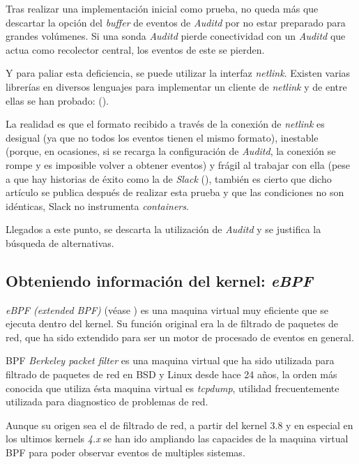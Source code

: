 Tras realizar una implementación inicial como prueba, no queda más que descartar la opción del \emph{buffer} de eventos de  \emph{Auditd} por no estar preparado para grandes volúmenes.
Si una sonda \emph{Auditd} pierde conectividad con un \emph{Auditd} que actua como recolector central, los eventos de este se pierden.

Y para paliar esta deficiencia, se puede utilizar la interfaz \emph{netlink}. Existen varias librerías en diversos lenguajes para implementar un cliente de \emph{netlink} y de entre ellas
se han probado: (\cite{netlink-glnpy,netlink-audit-go,netlink-go-audit}).

La realidad es que el formato recibido a través de la conexión de \emph{netlink} es desigual (ya que no todos los eventos tienen el mismo formato), inestable (porque, en ocasiones, si se recarga la configuración de \emph{Auditd}, la conexión se rompe y es imposible volver a obtener eventos) y frágil al trabajar con ella (pese a que hay historias de éxito
como la de \emph{Slack} (\cite{netlink-slack-success}), también es cierto que dicho artículo se publica después de realizar esta prueba y que las condiciones no son idénticas, Slack no instrumenta \emph{containers}.

Llegados a este punto, se descarta la utilización de \emph{Auditd} y se justifica la búsqueda de alternativas.

\subsection{Obteniendo información del kernel: \emph{eBPF}}
\label{subsec:ebpf}

\emph{eBPF (extended BPF)} (véase \cite{ebpf-brendan-gregg,ebpf-series}) es una maquina virtual muy eficiente que se ejecuta dentro del kernel. Su función original era la de filtrado de paquetes de red, que ha sido
extendido para ser un motor de procesado de eventos en general.

BPF \emph{Berkeley packet filter} es una maquina virtual que ha sido utilizada para filtrado de paquetes de red en BSD y Linux desde hace 24 años, la orden
más conocida que utiliza ésta maquina virtual es \emph{tcpdump}, utilidad frecuentemente utilizada para diagnostico de problemas de red.

Aunque su origen sea el de filtrado de red, a partir del kernel 3.8 y en especial en los ultimos kernels \emph{4.x} se han ido ampliando las capacides de la maquina virtual BPF para poder
observar eventos de multiples sistemas.

